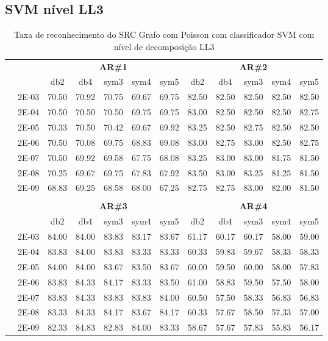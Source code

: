 \subsection{SVM nível LL3}
\begin{table}[H]
	\centering
    \normalsize
	\caption{Taxa de reconhecimento do SRC Grafo com Poisson com classificador SVM com nível de decomposição LL3}
	\begin{tabular}{|c|c|c c c c c|c c c c c|}
\cline{3-12}
\multicolumn{2}{c|}{\multirow{2}{*}{}} & \multicolumn{5}{c|}{\textbf{AR\#1}}  & \multicolumn{5}{c|}{\textbf{AR\#2}} \\\cline{3-12}

\multicolumn{2}{c|}{}  & db2 & db4 & sym3 & sym4 & sym5 & db2 & db4& sym3 & sym4 & sym5 \\\hline
\multicolumn{1}{|c|}{ \multirow{6}{*}{\rotatebox[origin=c]{90}{\textbf{Gamma}}} }
&2E-03&	70.50&	70.92&	70.75&	69.67&	69.75&	82.50&	82.50&	82.50&	82.50&	82.50	\\\cline{2-12}
&2E-04&	70.50&	70.50&	70.50&	69.75&	69.75&	83.00&	82.50&	82.50&	82.50&	82.75	\\\cline{2-12}
&2E-05&	70.33&	70.50&	70.42&	69.67&	69.92&	83.25&	82.50&	82.75&	82.50&	82.50	\\\cline{2-12}
&2E-06&	70.50&	70.08&	69.75&	68.83&	69.08&	83.00&	82.75&	83.00&	82.50&	82.75	\\\cline{2-12}
&2E-07&	70.50&	69.92&	69.58&	67.75&	68.08&	83.25&	83.00&	83.00&	81.75&	81.50	\\\cline{2-12}
&2E-08&	70.25&	69.67&	69.75&	67.83&	67.92&	83.50&	83.00&	83.25&	81.25&	81.50	\\\cline{2-12}
&2E-09&	68.83&	69.25&	68.58&	68.00&	67.25&	82.75&	82.75&	83.00&	82.00&	81.50	

	
\\ \midrule
\multicolumn{12}{c}{}\\ 

\cline{3-12}
\multicolumn{2}{c}{} & \multicolumn{5}{|c|}{\textbf{AR\#3}}  & \multicolumn{5}{c|}{\textbf{AR\#4}} \\\cline{3-12}
\multicolumn{2}{c}{}  & \multicolumn{1}{|c}{db2} & db4 & sym3 & sym4 & sym5 & db2 & db4& sym3 & sym4 & sym5 \\\hline
\multicolumn{1}{|c|}{ \multirow{6}{*}{\rotatebox[origin=c]{90}{\textbf{Gamma}}} }
&2E-03&	84.00&	84.00&	83.83&	83.17&	83.67&	61.17&	60.17&	60.17&	58.00&	59.00	\\\cline{2-12}
&2E-04&	83.83&	84.00&	83.83&	83.33&	83.33&	60.33&	59.83&	59.67&	58.33&	58.33	\\\cline{2-12}
&2E-05&	84.00&	84.00&	83.67&	83.50&	83.67&	60.00&	59.50&	60.00&	58.00&	57.83	\\\cline{2-12}
&2E-06&	83.83&	84.33&	84.17&	83.33&	83.50&	61.00&	58.83&	59.50&	57.50&	58.00	\\\cline{2-12}
&2E-07&	83.83&	84.33&	83.83&	83.83&	84.00&	60.50&	57.50&	58.33&	56.83&	56.83	\\\cline{2-12}
&2E-08&	83.33&	84.33&	84.17&	83.67&	84.17&	60.33&	57.67&	58.50&	57.33&	57.00	\\\cline{2-12}
&2E-09&	82.33&	84.83&	82.83&	84.00&	83.33&	58.67&	57.67&	57.83&	55.83&	56.17	
	

\end{tabular}
\end{table}
